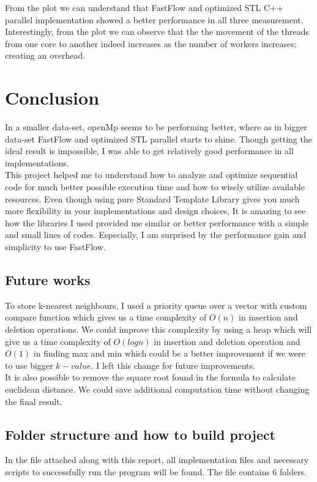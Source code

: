 \documentclass[12pt,a4paper]{report}
\begin{document}
From the plot we can understand that FastFlow and optimized STL C++ parallel implementation showed a better performance in all three measurement. Interestingly, from the plot we can observe that the the movement of the threads from one core to another indeed increases as the number of workers increases; creating an overhead.
\chapter{Conclusion}

In a smaller data-set, openMp seems to be performing better, where as in bigger data-set FastFlow and optimized STL parallel starts to shine. Though getting the ideal result is impossible, I was able to get relatively good performance in all implementations. \\


This project helped me to understand how to analyze and optimize sequential code for much better possible execution time and how to wisely utilize available resources. Even though using pure Standard Template Library gives you much more flexibility in your implementations and design choices, It is amazing to see how the libraries I used provided me similar or better performance with a simple and small lines of codes. Especially, I am surprised by the performance gain and simplicity to use FastFlow.

\section{Future works}
To store k-nearest neighbours, I used a priority queue over a vector with custom compare function which gives us a time complexity of $O(n)$ in insertion and deletion operations. We could improve this complexity by using a heap which will give us a time complexity of $O(logn)$ in insertion and deletion operation and $O(1)$ in finding max and min which could be a better improvement if we were to use bigger $k-value$. I left this change for future improvements. \\

It is also possible to remove the square root found in the formula to calculate euclidean distance. We could save additional computation time without changing the final result.

\section{Folder structure and how to build project}
In the file attached along with this report, all implementation files and necessary scripts to successfully run the program will be found. The file contains 6 folders.
\end{document}
